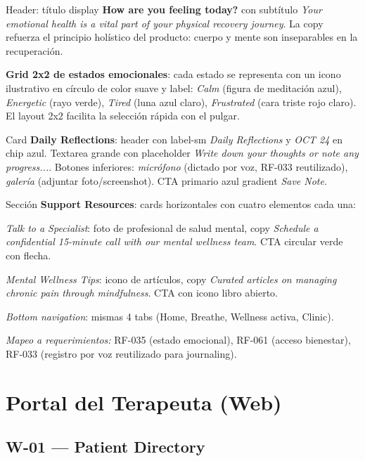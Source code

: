 Header: título display \textbf{How are you feeling today?} con subtítulo \textit{Your emotional health is a vital part of your physical recovery journey}. La copy refuerza el principio holístico del producto: cuerpo y mente son inseparables en la recuperación.

\textbf{Grid 2x2 de estados emocionales}: cada estado se representa con un icono ilustrativo en círculo de color suave y label: \textit{Calm} (figura de meditación azul), \textit{Energetic} (rayo verde), \textit{Tired} (luna azul claro), \textit{Frustrated} (cara triste rojo claro). El layout 2x2 facilita la selección rápida con el pulgar.

Card \textbf{Daily Reflections}: header con label-sm \textit{Daily Reflections} y \textit{OCT 24} en chip azul. Textarea grande con placeholder \textit{Write down your thoughts or note any progress...}. Botones inferiores: \textit{micrófono} (dictado por voz, RF-033 reutilizado), \textit{galería} (adjuntar foto/screenshot). CTA primario azul gradient \textit{Save Note}.

Sección \textbf{Support Resources}: cards horizontales con cuatro elementos cada una:

\textit{Talk to a Specialist}: foto de profesional de salud mental, copy \textit{Schedule a confidential 15-minute call with our mental wellness team}. CTA circular verde con flecha.

\textit{Mental Wellness Tips}: icono de artículos, copy \textit{Curated articles on managing chronic pain through mindfulness}. CTA con icono libro abierto.

\textit{Bottom navigation}: mismas 4 tabs (Home, Breathe, Wellness activa, Clinic).

\textit{Mapeo a requerimientos:} RF-035 (estado emocional), RF-061 (acceso bienestar), RF-033 (registro por voz reutilizado para journaling).


\section{Portal del Terapeuta (Web)}

\subsection{W-01 --- Patient Directory}

